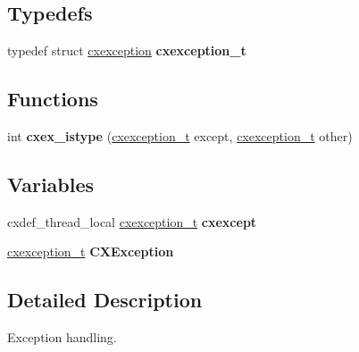 \subsection*{Typedefs}
\begin{DoxyCompactItemize}
\item 
\mbox{\label{a00011_a6a643c4c3fe776c4e158afba6ac87c7a}} 
typedef struct \hyperlink{a00048}{cxexception} {\bfseries cxexception\+\_\+t}
\end{DoxyCompactItemize}
\subsection*{Functions}
\begin{DoxyCompactItemize}
\item 
\mbox{\label{a00011_a12358a045dfda6e1f68e043ee6fd0f4b}} 
int {\bfseries cxex\+\_\+istype} (\hyperlink{a00048}{cxexception\+\_\+t} except, \hyperlink{a00048}{cxexception\+\_\+t} other)
\end{DoxyCompactItemize}
\subsection*{Variables}
\begin{DoxyCompactItemize}
\item 
\mbox{\label{a00011_afd15a1d98ac79a209f475756608bf619}} 
cxdef\+\_\+thread\+\_\+local \hyperlink{a00048}{cxexception\+\_\+t} {\bfseries cxexcept}
\item 
\mbox{\label{a00011_ac73de8289fd5bc03032a3725c501dca1}} 
\hyperlink{a00048}{cxexception\+\_\+t} {\bfseries C\+X\+Exception}
\end{DoxyCompactItemize}


\subsection{Detailed Description}
Exception handling. 

